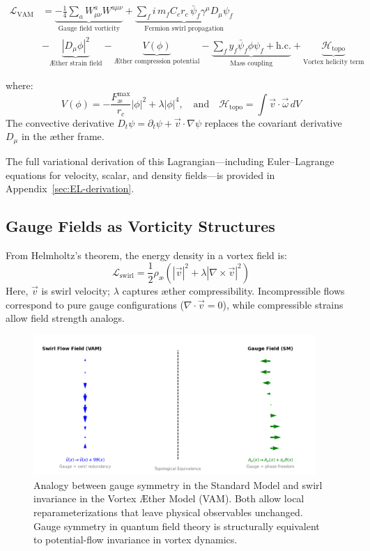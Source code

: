 \begin{align*}
    \mathcal{L}_\text{VAM} &= \underbrace{-\frac{1}{4} \sum_{a} W^{a}_{\mu\nu} W^{a\mu\nu}}_{\text{Gauge field vorticity}}
    + \underbrace{\sum_{f} i \, m_f C_e r_c \, \bar{\psi}_f \gamma^\mu D_\mu \psi_f}_{\text{Fermion swirl propagation}} \\
    &- \underbrace{|D_\mu \phi|^2}_{\text{\AE{}ther strain field}}
    - \underbrace{V(\phi)}_{\text{\AE{}ther compression potential}}
    - \underbrace{\sum_f y_f \bar{\psi}_f \phi \psi_f + \text{h.c.}}_{\text{Mass coupling}}
    + \underbrace{\mathcal{H}_\text{topo}}_{\text{Vortex helicity term}}
\end{align*}

\noindent where:
\[
    V(\phi) = -\frac{F^{\text{max}}_{\text{\ae}}}{r_c}|\phi|^2 + \lambda |\phi|^4,
    \quad \text{and} \quad \mathcal{H}_\text{topo} = \int \vec{v} \cdot \vec{\omega} \, dV
\]
The convective derivative \( D_t \psi = \partial_t \psi + \vec{v} \cdot \nabla \psi \) replaces the covariant derivative \( D_\mu \) in the æther frame.

The full variational derivation of this Lagrangian—including Euler--Lagrange equations for velocity, scalar, and density fields—is provided in Appendix~\ref{sec:EL-derivation}.

\subsection{Gauge Fields as Vorticity Structures}
From Helmholtz's theorem, the energy density in a vortex field is:
\begin{equation}
    \mathcal{L}_{\text{swirl}} = \frac{1}{2} \rho_\text{\ae} \left( |\vec{v}|^2 + \lambda |\nabla \times \vec{v}|^2 \right)
\end{equation}
Here, $\vec{v}$ is swirl velocity; $\lambda$ captures \ae{}ther compressibility. Incompressible flows correspond to pure gauge configurations ($\nabla \cdot \vec{v} = 0$), while compressible strains allow field strength analogs.

\begin{figure}[H]
    \centering
    \includegraphics[width=0.95\textwidth]{images/gauge_swirl_equivalence}
    \caption{Analogy between gauge symmetry in the Standard Model and swirl invariance in the Vortex \AE{}ther Model (VAM). Both allow local reparameterizations that leave physical observables unchanged. Gauge symmetry in quantum field theory is structurally equivalent to potential-flow invariance in vortex dynamics.}
    \label{fig:gauge_swirl_equivalence}
\end{figure}


